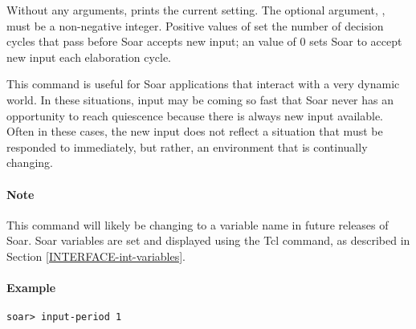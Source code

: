 {Without any arguments,  prints the current setting. The
optional argument, , must be a non-negative integer. Positive values
of  set the number of decision cycles that pass before Soar accepts
new input; an  value of 0 sets Soar to accept new input each
elaboration cycle.

This command is useful for Soar applications that interact with a very dynamic
world. In these situations, input may be coming so fast that Soar never has an
opportunity to reach quiescence because there is always new input available.
Often in these cases, the new input does not reflect a situation that must be
responded to immediately, but rather, an environment that is continually
changing. 


\paragraph{Note}

This command will likely be changing to a variable name 
in future releases of Soar. Soar variables are set and displayed using the Tcl
 command, as described in Section \ref{INTERFACE-int-variables}.

\paragraph{Example}
\begin{verbatim}
soar> input-period 1
\end{verbatim}

}
